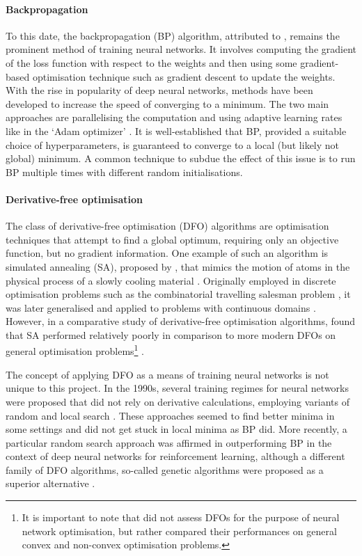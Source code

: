 \paragraph{Backpropagation}
To this date, the backpropagation (BP) algorithm, attributed to \textcite{rumelhart1986}, remains the prominent method of training neural networks.
It involves computing the gradient of the loss function with respect to the weights and then using some gradient-based optimisation technique such as gradient descent to update the weights.
With the rise in popularity of deep neural networks, methods have been developed to increase the speed of converging to a minimum. 
The two main approaches are parallelising the computation and using adaptive learning rates like in the `Adam optimizer' \cite{kingma2014}.
It is well-established that BP, provided a suitable choice of hyperparameters, is guaranteed to converge to a local (but likely not global) minimum.
A common technique to subdue the effect of this issue is to run BP multiple times with different random initialisations.

\paragraph{Derivative-free optimisation}
The class of derivative-free optimisation (DFO) algorithms are optimisation techniques that attempt to find a global optimum, requiring only an objective function, but no gradient information.
One example of such an algorithm is simulated annealing (SA), proposed by \citeauthor{kirkpatrick1983}, that mimics the motion of atoms in the physical process of a slowly cooling material \cite*{kirkpatrick1983}.
Originally employed in discrete optimisation problems such as the combinatorial travelling salesman problem \cite{cerny1985}, it was later generalised and applied to problems with continuous domains \cite{belisle1993}.
However, in a comparative study of derivative-free optimisation algorithms, \citeauthor{rios2009} found that SA performed relatively poorly in comparison to more modern DFOs on general optimisation problems\footnote{It is important to note that \citeauthor{rios2009} did not assess DFOs for the purpose of neural network optimisation, but rather compared their performances on general convex and non-convex optimisation problems.} \cite*{rios2009}.

The concept of applying DFO as a means of training neural networks is not unique to this project.
In the 1990s, several training regimes for neural networks were proposed that did not rely on derivative calculations, employing variants of random and local search \cite{hirasawa1998,battiti1995}.
These approaches seemed to find better minima in some settings and did not get stuck in local minima as BP did. 
More recently, a particular random search approach was affirmed in outperforming BP in the context of deep neural networks for reinforcement learning, although a different family of DFO algorithms, so-called genetic algorithms were proposed as a superior alternative \cite{such2017}.

